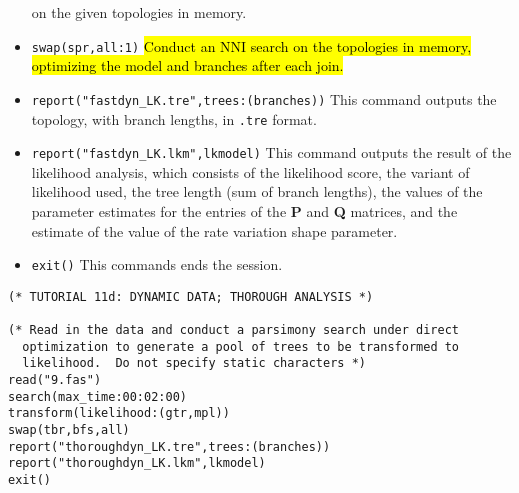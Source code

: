 \begin{itemize}
on the given topologies in memory.
\item \texttt{swap(spr,all:1)} \hl{Conduct an NNI search on the topologies in memory, optimizing the model and branches after
each join.}
\item \texttt{report("fastdyn\_LK.tre",trees:(branches))} This command outputs the topology, with branch lengths, in 
\texttt{.tre} format.
\item \texttt{report("fastdyn\_LK.lkm",lkmodel)} This command outputs the result of the likelihood analysis, which 
consists of the likelihood score, the variant of likelihood used, the tree length (sum of branch lengths), the values 
of the parameter estimates for the entries of the \textbf{P} and \textbf{Q} matrices, and the estimate of the value of 
the rate variation shape parameter.
\item \texttt{exit()} This commands ends the \poy session.
\end{itemize}

\begin{verbatim}
(* TUTORIAL 11d: DYNAMIC DATA; THOROUGH ANALYSIS *)

(* Read in the data and conduct a parsimony search under direct 
  optimization to generate a pool of trees to be transformed to 
  likelihood.  Do not specify static characters *)
read("9.fas")
search(max_time:00:02:00)
transform(likelihood:(gtr,mpl))
swap(tbr,bfs,all)
report("thoroughdyn_LK.tre",trees:(branches))
report("thoroughdyn_LK.lkm",lkmodel)
exit()
\end{verbatim}


